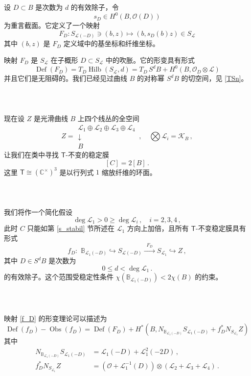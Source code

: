 \documentclass[12pt]{article}
\newcommand{\bB}{\mathbb{B}}
\newcommand{\cO}{\mathscr{O}}
\newcommand{\cL}{\mathscr{L}}
\DeclareMathOperator{\Hilb}{Hilb}
\DeclareMathOperator{\Def}{Def}
\DeclareMathOperator{\Obs}{Obs}
\newcommand{\Ct}{\mathbb{C}^{\times}}
\newcommand{\bT}{\mathsf{T}}
\newcommand{\cK}{\mathscr{K}}
\theoremstyle{definition}
\begin{document}
\subsubsection{\ }
设 $D\subset B$ 是次数为 $d$ 的有效除子，令
$$
s_D \in H^0(B,\cO(D))
$$
为重言截面。它定义了一个映射
$$
F_D: S_{\cL(-D)} \owns (b,z) \mapsto (b,s_D(b) z) \in S_{\cL}
$$
其中 $(b,z)$ 是 $F_D$ 定义域中的基坐标和纤维坐标。

映射 $F_D$ 是 $S_{\cL}$ 在子概形 $D\subset
S_{\cL}$ 中的吹胀。它的形变具有形式
$$
\Def(F_D)= T_{D} \Hilb(S_{\cL},d) = T_D \, S^d B + H^0(B,\cO_D
\otimes \cL)
$$
并且它们是无阻碍的。我们已经见过曲线 $B$ 的对称幂 $S^dB$ 的切空间，见 \eqref{TSn}。

\subsubsection{\ }
现在设 $Z$ 是光滑曲线 $B$ 上四个线丛的全空间
$$
Z =
\begin{matrix}
\cL_1 \oplus \cL_2 \oplus \cL_3 \oplus \cL_4 \\
\downarrow\\
B
\end{matrix} \,, \quad \bigotimes \cL_i = \cK_B \,,
$$
让我们在类中寻找 $\bT$-不变的稳定膜
$$
[C] = 2 [B] \,.
$$
这里 $\bT\cong (\Ct)^3$ 是以行列式 $1$ 缩放纤维的环面。

\subsubsection{\ }
我们将作一个简化假设
$$
\deg \cL_1 > 0 \ge \deg \cL_i\,,\quad i=2,3,4 \,,
$$
此时 $C$ 只能如第 \ref{s_stabil} 节所述在 $\cL_1$ 方向上加倍，且所有 $\bT$-不变稳定膜具有形式
\begin{equation}
f_D : \,\, \bB_{\cL_1(-D)}
\hookrightarrow S_{\cL(-D)}
\xrightarrow{\,\,\, F_D \,\,\,} S_{\cL_1} \hookrightarrow Z\,, \label{f_D}
\end{equation}
其中 $D\in S^d B$ 是次数为
$$
0 \le d < \deg \cL_1 \,.
$$
的有效除子。这个范围受稳定性条件 $
\chi\left(\bB_{\cL_1(-D)} \right)< 2  \chi(B)
$ 的约束。

\subsubsection{\ }
映射 \eqref{f_D} 的形变理论可以描述为
$$
\Def(f_D) - \Obs(f_D) = \Def(F_D) + H^*\left(B,N_{\bB_{\cL_1(-D)}} S_{\cL_1(-D)}
+ f_D^* N_{S_{\cL_1}} Z\right)
$$
其中
\begin{align*}
 N_{\bB_{\cL_1(-D)}} S_{\cL_1(-D)}  &= \cL_1(-D) +  \cL_1^2(-2D)\,,\\
f_D^* N_{S_{\cL_1}} Z &= (\cO + \cL_1^{-1}(D)) \otimes (\cL_2
+\cL_3+\cL_4) \,.
\end{align*}
\end{document}
